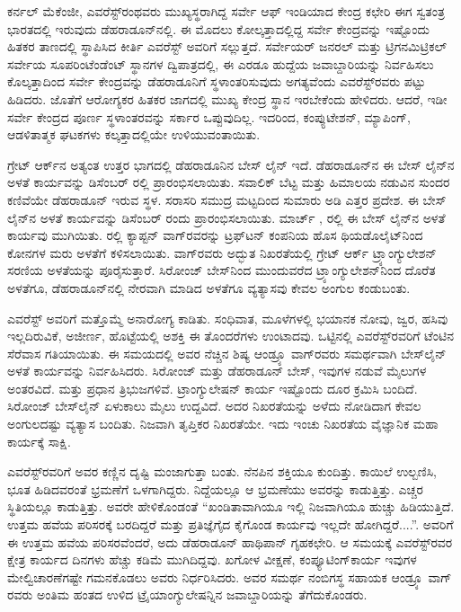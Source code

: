 ಕರ್ನಲ್​ ಮೆಕೆಂಜೀ, ಎವರೆಸ್ಟ್​ರಂಥವರು ಮುಖ್ಯಸ್ಥರಾಗಿದ್ದ ಸರ್ವೇ ಆಫ್​ ಇಂಡಿಯಾದ ಕೇಂದ್ರ ಕಛೇರಿ ಈಗ ಸ್ವತಂತ್ರ ಭಾರತದಲ್ಲಿ ಇರುವುದು ಡೆಹರಾಡೂನ್​ನಲ್ಲಿ. ಈ ಮೊದಲು ಕೋಲ್ಕತ್ತಾದಲ್ಲಿದ್ದ ಸರ್ವೇ ಕೇಂದ್ರವನ್ನು ಇಷ್ಟೊಂದು ಹಿತಕರ ತಾಣದಲ್ಲಿ ಸ್ಥಾಪಿಸಿದ ಕೀರ್ತಿ ಎವರೆಸ್ಟ್​ ಅವರಿಗೆ ಸಲ್ಲುತ್ತದೆ. ಸರ್ವೇಯರ್​ ಜನರಲ್​ ಮತ್ತು ಟ್ರಿಗನಮಿಟ್ರಿಕಲ್​ ಸರ್ವೇಯ ಸೂಪರಿಂಟೆಂಡೆಂಟ್​ ಸ್ಥಾನಗಳ ದ್ವಿಪಾತ್ರದಲ್ಲಿ, ಈ ಎರಡೂ ಹುದ್ದೆಯ ಜವಾಬ್ದಾರಿಯನ್ನು ನಿರ್ವಹಿಸಲು ಕೊಲ್ಕತ್ತಾದಿಂದ ಸರ್ವೇ ಕೇಂದ್ರವನ್ನು ಡೆಹರಾಡೂನಿಗೆ ಸ್ಥಳಾಂತರಿಸುವುದು ಅಗತ್ಯವೆಂದು ಎವರೆಸ್ಟ್​ರವರು ಪಟ್ಟು ಹಿಡಿದರು. ಜೊತೆಗೆ ಆರೋಗ್ಯಕರ ಹಿತಕರ ಜಾಗದಲ್ಲಿ ಮುಖ್ಯ ಕೇಂದ್ರ ಸ್ಥಾನ ಇರಬೇಕೆಂದು ಹೇಳಿದರು. ಆದರೆ, ಇಡೀ ಸರ್ವೇ ಕೇಂದ್ರದ ಪೂರ್ಣ ಸ್ಥಳಾಂತರವನ್ನು ಸರ್ಕಾರ ಒಪ್ಪುವುದಿಲ್ಲ. ಇದರಿಂದ, ಕಂಪ್ಯುಟೇಶನ್​, ಮ್ಯಾಪಿಂಗ್​, ಆಡಳಿತಾತ್ಮಕ ಘಟಕಗಳು ಕಲ್ಕತ್ತಾದಲ್ಲಿಯೇ ಉಳಿಯುವಂತಾಯಿತು.

ಗ್ರೇಟ್​ ಆರ್ಕ್‌ನ ಅತ್ಯಂತ ಉತ್ತರ ಭಾಗದಲ್ಲಿ ಡೆಹರಾಡೂನಿನ ಬೇಸ್​ ಲೈನ್​ ಇದೆ. ಡೆಹರಾಡೂನ್​ನ ಈ ಬೇಸ್​ ಲೈನ್​ನ ಅಳತೆ ಕಾರ್ಯವನ್ನು ಡಿಸೆಂಬರ್​  ರಲ್ಲಿ ಪ್ರಾರಂಭಿಸಲಾಯಿತು. ಸವಾಲಿಕ್​ ಬೆಟ್ಟ ಮತ್ತು ಹಿಮಾಲಯ ನಡುವಿನ ಸುಂದರ ಕಣಿವೆಯೇ ಡೆಹರಾಡೂನ್​ ಇರುವ ಸ್ಥಳ. ಸರಾಸರಿ ಸಮುದ್ರ ಮಟ್ಟದಿಂದ ಸುಮಾರು  ಅಡಿ ಎತ್ತರ ಪ್ರದೇಶ. ಈ ಬೇಸ್​ ಲೈನ್​ನ ಅಳತೆ ಕಾರ್ಯವನ್ನು ಡಿಸೆಂಬರ್​  ರಂದು ಪ್ರಾರಂಭಿಸಲಾಯಿತು. ಮಾರ್ಚ್ ,  ರಲ್ಲಿ ಈ ಬೇಸ್​ ಲೈನ್​ನ ಅಳತೆ ಕಾರ್ಯವು ಮುಗಿಯಿತು.  ರಲ್ಲಿ ಕ್ಯಾಪ್ಟನ್​ ವಾಗ್​ರವರನ್ನು ಟ್ರಫ್​ಟನ್​ ಕಂಪನಿಯ ಹೊಸ ಥಿಯಡೊಲೈಟ್​ನಿಂದ ಕೋನಗಳ ಮರು ಅಳತೆಗೆ ಕಳಿಸಲಾಯಿತು. ವಾಗ್​ರವರು ಅದ್ಭುತ ನಿಖರತೆಯಲ್ಲಿ ಗ್ರೇಟ್​ ಆರ್ಕ್ ಟ್ರ್ಯಾಂಗ್ಯುಲೇಶನ್​ ಸರಣಿಯ ಅಳತೆಯನ್ನು ಪೂರೈಸುತ್ತಾರೆ. ಸಿರೋಂಜ್​ ಬೇಸ್​ನಿಂದ ಮುಂದುವರೆದ ಟ್ರ್ಯಾಂಗ್ಯುಲೇಶನ್​ನಿಂದ ದೊರೆತ ಅಳತೆಗೂ, ಡೆಹರಾಡೂನ್​ನಲ್ಲಿ ನೇರವಾಗಿ ಮಾಡಿದ ಅಳತೆಗೂ ವ್ಯತ್ಯಾಸವು ಕೇವಲ  ಅಂಗುಲ ಕಂಡುಬಂತು.

ಎವರೆಸ್ಟ್​ ಅವರಿಗೆ ಮತ್ತೊಮ್ಮೆ ಅನಾರೋಗ್ಯ ಕಾಡಿತು. ಸಂಧಿವಾತ, ಮೂಳೆಗಳಲ್ಲಿ ಭಯಾನಕ ನೋವು, ಜ್ವರ, ಹಸಿವು ಇಲ್ಲದಿರುವಿಕೆ, ಅಜೀರ್ಣ, ಹೊಟ್ಟೆಯಲ್ಲಿ ಅಶಕ್ತಿ ಈ ತೊಂದರೆಗಳು ಉಂಟಾದವು. ಒಟ್ಟಿನಲ್ಲಿ ಎವರೆಸ್ಟ್​ರವರಿಗೆ ಟೆಂಟಿನ ಸೆರೆವಾಸ ಗತಿಯಾಯಿತು. ಈ ಸಮಯದಲ್ಲಿ ಅವರ ನೆಚ್ಚಿನ ಶಿಷ್ಯ ಆಂಡ್ರ್ಯೂ ವಾಗ್​ರವರು ಸಮರ್ಥವಾಗಿ ಬೇಸ್​ಲೈನ್​ ಅಳತೆ ಕಾರ್ಯವನ್ನು ನಿರ್ವಹಿಸಿದರು. ಸಿರೋಂಜ್​ ಮತ್ತು ಡೆಹರಾಡೂನ್​ ಬೇಸ್​, ಇವುಗಳ ನಡುವೆ  ಮೈಲುಗಳ ಅಂತರವಿದೆ. ಮತ್ತು  ಪ್ರಧಾನ ತ್ರಿಭುಜಗಳಿವೆ. ಟ್ರಾಂಗ್ಯುಲೇಷನ್​ ಕಾರ್ಯ ಇಷ್ಟೊಂದು ದೂರ ಕ್ರಮಿಸಿ ಬಂದಿದೆ. ಸಿರೋಂಜ್​ ಬೇಸ್​ ಲೈನ್​ ಏಳುಕಾಲು ಮೈಲು ಉದ್ದವಿದೆ. ಅದರ ನಿಖರತೆಯನ್ನು ಅಳೆದು ನೋಡಿದಾಗ ಕೇವಲ  ಅಂಗುಲದಷ್ಟು ವ್ಯತ್ಯಾಸ ಬಂದಿತು. ನಿಜವಾಗಿ ತೃಪ್ತಿಕರ ನಿಖರತೆಯೇ. ಇದು ಇಂಚು ನಿಖರತೆಯ ವೈಜ್ಞಾನಿಕ ಮಹಾ ಕಾರ್ಯಕ್ಕೆ ಸಾಕ್ಷಿ.

ಎವರೆಸ್ಟ್​ರವರಿಗೆ ಅವರ ಕಣ್ಣಿನ ದೃಷ್ಟಿ ಮಂಜಾಗುತ್ತಾ ಬಂತು. ನೆನಪಿನ ಶಕ್ತಿಯೂ ಕುಂದಿತ್ತು. ಕಾಯಿಲೆ ಉಲ್ಬಣಿಸಿ, ಭೂತ ಹಿಡಿದವರಂತೆ ಭ್ರಮಣೆಗೆ ಒಳಗಾಗಿದ್ದರು. ನಿದ್ದೆಯಲ್ಲೂ ಆ ಭ್ರಮಣೆಯು ಅವರನ್ನು ಕಾಡುತ್ತಿತ್ತು. ಎಚ್ಚರ ಸ್ಥಿತಿಯಲ್ಲೂ ಕಾಡುತ್ತಿತ್ತು. ಅವರೇ ಹೇಳಿಕೊಂಡಂತೆ “ಖಂಡಿತಾವಾಗಿಯೂ ಇಲ್ಲಿ ನಿಜವಾಗಿಯೂ ಹುಚ್ಚು ಹಿಡಿಯುತ್ತಿದೆ. ಉತ್ತಮ ಹವೆಯ ಪರಿಸರಕ್ಕೆ ಬರದಿದ್ದರೆ ಮತ್ತು ಪ್ರತಿಜ್ಞೆಗೈದ ಕೈಗೊಂಡ ಕಾರ್ಯವು ಇಲ್ಲದೇ ಹೋಗಿದ್ದರೆ....”. ಅವರಿಗೆ ಈ ಉತ್ತಮ ಹವೆಯ ಪರಿಸರವೆಂದರೆ, ಅದು ಡೆಹರಾಡೂನ್​ ಹಾಥಿಪಾನ್​ ಗೃಹಕಛೇರಿ. ಆ ಸಮಯಕ್ಕೆ ಎವರೆಸ್ಟ್​ರವರ ಕ್ಷೇತ್ರ ಕಾರ್ಯದ ದಿನಗಳು ಹೆಚ್ಚು ಕಡಿಮೆ ಮುಗಿದಿದ್ದವು. ಖಗೋಳ ವೀಕ್ಷಣೆ, ಕಂಪ್ಯೂಟಿಂಗ್​ ಕಾರ್ಯ ಇವುಗಳ ಮೇಲ್ವಿಚಾರಣೆಗಷ್ಟೇ ಗಮನಕೊಡಲು ಅವರು ನಿರ್ಧರಿಸಿದರು. ಅವರ ಸಮರ್ಥ ನಂಬಿಗಸ್ಥ ಸಹಾಯಕ ಆಂಡ್ರ್ಯೂ ವಾಗ್​ರವರು ಅಂತಿಮ ಹಂತದ ಉಳಿದ ಟ್ರೈಯಾಂಗ್ಯುಲೇಷನ್ನಿನ ಜವಾಬ್ದಾರಿಯನ್ನು ತೆಗೆದುಕೊಂಡರು.

